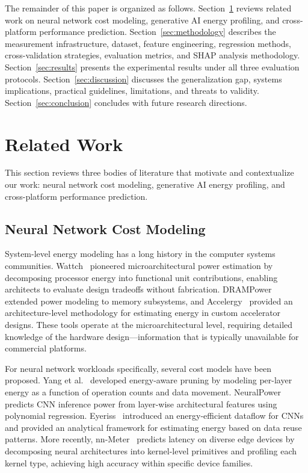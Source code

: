 \documentclass{ieeeaccess}
\begin{document}
The remainder of this paper is organized as follows.
Section~\ref{sec:related_work} reviews related work on neural network cost modeling, generative AI energy profiling, and cross-platform performance prediction.
Section~\ref{sec:methodology} describes the measurement infrastructure, dataset, feature engineering, regression methods, cross-validation strategies, evaluation metrics, and SHAP analysis methodology.
Section~\ref{sec:results} presents the experimental results under all three evaluation protocols.
Section~\ref{sec:discussion} discusses the generalization gap, systems implications, practical guidelines, limitations, and threats to validity.
Section~\ref{sec:conclusion} concludes with future research directions.


\section{Related Work}
\label{sec:related_work}

This section reviews three bodies of literature that motivate and contextualize our work: neural network cost modeling, generative AI energy profiling, and cross-platform performance prediction.

\subsection{Neural Network Cost Modeling}
\label{sec:rw_cost_modeling}

System-level energy modeling has a long history in the computer systems communities.
Wattch~\cite{brooks2000wattch} pioneered microarchitectural power estimation by decomposing processor energy into functional unit contributions, enabling architects to evaluate design tradeoffs without fabrication.
DRAMPower~\cite{chandrasekar2012drampower} extended power modeling to memory subsystems, and Accelergy~\cite{wu2019machine} provided an architecture-level methodology for estimating energy in custom accelerator designs.
These tools operate at the microarchitectural level, requiring detailed knowledge of the hardware design---information that is typically unavailable for commercial platforms.

For neural network workloads specifically, several cost models have been proposed.
Yang et al.~\cite{yang2017designing} developed energy-aware pruning by modeling per-layer energy as a function of operation counts and data movement.
NeuralPower~\cite{cai2017neuralpower} predicts CNN inference power from layer-wise architectural features using polynomial regression.
Eyeriss~\cite{chen2016eyeriss} introduced an energy-efficient dataflow for CNNs and provided an analytical framework for estimating energy based on data reuse patterns.
More recently, nn-Meter~\cite{zhang2021nnmeter} predicts latency on diverse edge devices by decomposing neural architectures into kernel-level primitives and profiling each kernel type, achieving high accuracy within specific device families.
\end{document}
